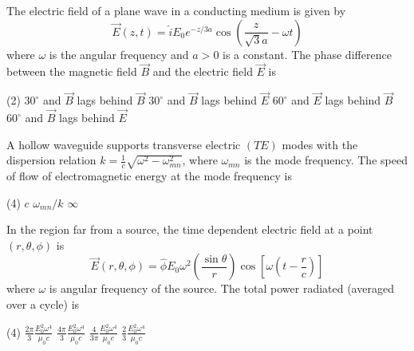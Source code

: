 \begin{enumerate}
\begin{minipage}{\textwidth}
	\item The electric field of a plane wave in a conducting medium is given by
	$$
	\vec{E}(z, t)=\hat{i} E_{0} e^{-z / 3 a} \cos \left(\frac{z}{\sqrt{3} a}-\omega t\right)
	$$
	where $\omega$ is the angular frequency and $a>0$ is a constant. The phase difference between the magnetic field $\vec{B}$ and the electric field $\vec{E}$ is
\end{minipage}
\begin{tasks}(2)
	\task[\textbf{A.}] $30^{\circ}$ and $\vec{B}$ lags behind $\vec{B}$
	\task[\textbf{B.}]$30^{\circ}$ and $\vec{B}$ lags behind $\vec{E}$
	\task[\textbf{C.}]$60^{\circ}$ and $\vec{E}$ lags behind $\vec{B}$
	\task[\textbf{D.}]$60^{\circ}$ and $\vec{B}$ lags behind $\vec{E}$
\end{tasks}
\begin{minipage}{\textwidth}
	\item A hollow waveguide supports transverse electric $(T E)$ modes with the dispersion relation $k=\frac{1}{c} \sqrt{\omega^{2}-\omega_{m n}^{2}}$, where $\omega_{m n}$ is the mode frequency. The speed of flow of electromagnetic energy at the mode frequency is
\end{minipage}
\begin{tasks}(4)
	\task[\textbf{A.}] $c$
	\task[\textbf{B.}] $\omega_{m n} / k$
	\task[\textbf{D.}] $\infty$
\end{tasks}
\begin{minipage}{\textwidth}
	\item In the region far from a source, the time dependent electric field at a point $(r, \theta, \phi)$ is
	$$
	\vec{E}(r, \theta, \phi)=\hat{\phi} E_{0} \omega^{2}\left(\frac{\sin \theta}{r}\right) \cos \left[\omega\left(t-\frac{r}{c}\right)\right]
	$$
	where $\omega$ is angular frequency of the source. The total power radiated (averaged over a cycle) is
\end{minipage}
\begin{tasks}(4)
	\task[\textbf{A.}] $\frac{2 \pi}{3} \frac{E_{0}^{2} \omega^{4}}{\mu_{0} c}$
	\task[\textbf{B.}]$\frac{4 \pi}{3} \frac{E_{0}^{2} \omega^{4}}{\mu_{0} c}$
	\task[\textbf{C.}]$\frac{4}{3 \pi} \frac{E_{0}^{2} \omega^{4}}{\mu_{0} c}$
	\task[\textbf{D.}]$\frac{2}{3} \frac{E_{0}^{2} \omega^{4}}{\mu_{0} c}$
\end{tasks}
\begin{minipage}{\textwidth}

\end{minipage}
\end{enumerate}
